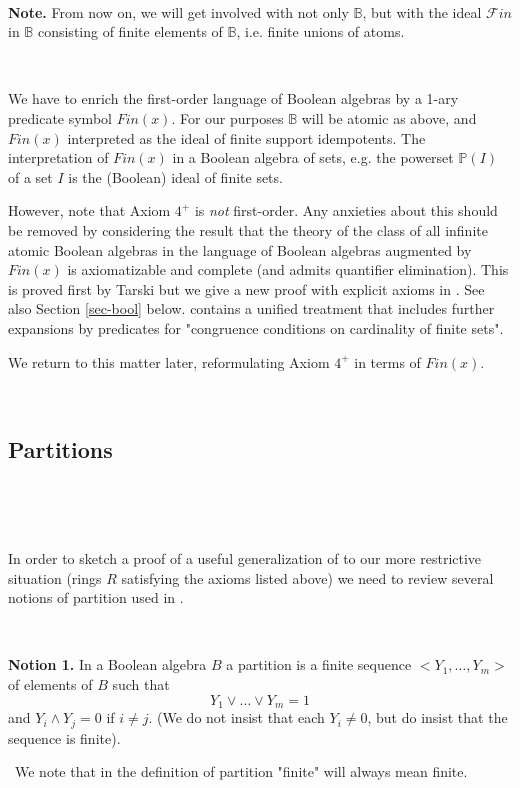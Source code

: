 \documentclass[12pt]{amsart}
\def\B{\mathbb{B}}
\def\P{\mathbb{P}}
\numberwithin{equation}{section}
\begin{document}
\

{\bf Note.} From now on, we will get involved with not only $\B$, but with the ideal $\mathcal{F}in$ in $\B$ consisting 
of finite elements of $\B$, i.e. finite unions of atoms.

\

We have to enrich the first-order language of Boolean algebras by a 1-ary predicate symbol 
$Fin(x)$. For our purposes $\B$ 
will be atomic as above, and $Fin(x)$ interpreted as 
the ideal of finite support idempotents. The interpretation of $Fin(x)$ in a Boolean algebra of sets, e.g. the powerset $\P(I)$ of a set $I$ is the (Boolean) ideal of finite sets. 

However, note that Axiom $4^+$ is {\it not} first-order. 
Any anxieties about this should be removed by considering the result that the theory of the class of all
infinite atomic Boolean algebras in the language of Boolean algebras augmented by $Fin(x)$ is axiomatizable and 
complete (and admits quantifier elimination). This is proved first by Tarski but we give a new proof with explicit axioms in 
\cite{DM-bool}. See also Section \ref{sec-bool} below. \cite{DM-bool} contains a unified treatment that includes further expansions by predicates for "congruence conditions on cardinality of finite sets". 

We return to this matter later, reformulating Axiom $4^+$ in terms of $Fin(x)$.

\

\subsection{Partitions}

\

\

In order to sketch a proof of a useful generalization of \cite{FV} to our more restrictive situation (rings $R$ satisfying the axioms listed above) we need to review several notions of partition used in \cite{FV}.

\

{\bf Notion 1.} In a Boolean algebra $B$ a partition is a finite sequence $<Y_1,\dots,Y_m>$ of elements of $B$ such that
$$Y_1 \vee \dots \vee Y_m=1$$
and $Y_i \wedge Y_j =0$ if $i\neq j$. (We do not insist that each $Y_i\neq 0$, but do insist that the sequence is finite).

\
We note that in the definition of partition "finite" will always mean finite.

\
\end{document}
